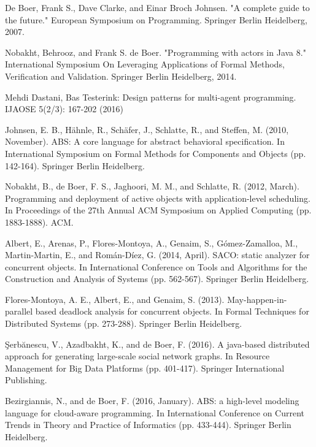 \documentclass[runningheads,a4paper]{llncs}
\begin{document}












\begin{thebibliography}{4}

De Boer, Frank S., Dave Clarke, and Einar Broch Johnsen. "A complete guide to the future." European Symposium on Programming. Springer Berlin Heidelberg, 2007.

 Nobakht, Behrooz, and Frank S. de Boer. "Programming with actors in Java 8." International Symposium On Leveraging Applications of Formal Methods, Verification and Validation. Springer Berlin Heidelberg, 2014.

 	Mehdi Dastani, Bas Testerink:
Design patterns for multi-agent programming. IJAOSE 5(2/3): 167-202 (2016)

 Johnsen, E. B., Hähnle, R., Schäfer, J., Schlatte, R., and Steffen, M. (2010, November). ABS: A core language for abstract behavioral specification. In International Symposium on Formal Methods for Components and Objects (pp. 142-164). Springer Berlin Heidelberg.

 Nobakht, B., de Boer, F. S., Jaghoori, M. M., and Schlatte, R. (2012, March). Programming and deployment of active objects with application-level scheduling. In Proceedings of the 27th Annual ACM Symposium on Applied Computing (pp. 1883-1888). ACM.

 Albert, E., Arenas, P., Flores-Montoya, A., Genaim, S., Gómez-Zamalloa, M., Martin-Martin, E., and Román-Díez, G. (2014, April). SACO: static analyzer for concurrent objects. In International Conference on Tools and Algorithms for the Construction and Analysis of Systems (pp. 562-567). Springer Berlin Heidelberg.

Flores-Montoya, A. E., Albert, E., and Genaim, S. (2013). May-happen-in-parallel based deadlock analysis for concurrent objects. In Formal Techniques for Distributed Systems (pp. 273-288). Springer Berlin Heidelberg.

Şerbănescu, V., Azadbakht, K., and de Boer, F. (2016). A java-based distributed approach for generating large-scale social network graphs. In Resource Management for Big Data Platforms (pp. 401-417). Springer International Publishing.

 Bezirgiannis, N., and de Boer, F. (2016, January). ABS: a high-level modeling language for cloud-aware programming. In International Conference on Current Trends in Theory and Practice of Informatics (pp. 433-444). Springer Berlin Heidelberg.


\end{thebibliography}
\end{document}

